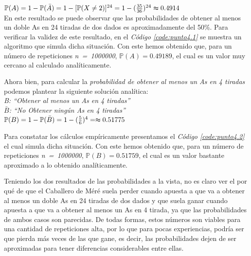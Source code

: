 \documentclass{article}
\newcommand{\refcode}[1]{\textit{Código \ref{#1}}}
\begin{document}
$\mathbb{P}(A) = 1 - \mathbb{P}(\bar{A}) = 1 - [\mathbb{P}(X \neq 2)]^{24} = 1- ({35 \over 36})^{24} \thickapprox 0.4914$ \medskip\\
 
En este resultado se puede observar que las probabilidades de obtener al menos un doble As en 24 tiradas de dos dados es aproximadamente del 50\%. Para verificar la validez de este resultado, en el \refcode{code:punto4.1} se muestra un algoritmo que simula dicha situación.  Con este hemos obtenido que, para un número de repeticiones \mbox{\textit{n = 1000000}}, $\mathbb{P}(A) = 0.49189$, el cual es un valor muy cercano al calculado analíticamente.

 
\bigskip\bigskip

	Ahora bien, para calcular la \textit{probabilidad de obtener al menos un As en 4 tiradas} podemos plantear la siguiente solución analítica:\\

\indent \textit{B: ``Obtener al menos un As en 4 tiradas''}\\
\indent \textit{$\bar{B}$: ``No Obtener ningún As en 4 tiradas''}\\

$\mathbb{P}(B) = 1 - \mathbb{P}(\bar{B}) = 1- ({5 \over 6})^4 = \thickapprox 0.51775$\\\bigskip

	Para constatar los cálculos empíricamente presentamos el \refcode{code:punto4.2} el cual simula dicha situación. Con este hemos obtenido que, para un número de repeticiones \mbox{\textit{n = 1000000}}, $\mathbb{P}(B) = 0.51759$, el cual es un valor bastante aproximado a lo obtenido analíticamente.

\newpage

\bigskip\bigskip

Teniendo los dos resultados de las probabilidades a la vista, no es claro ver el por qué de que el Caballero de Méré suela perder cuando apuesta a que va a obtener al menos un doble As en 24 tiradas de dos dados y que suela ganar cuando apuesta a que va a obtener al menos un As en 4 tirada, ya que las probabilidades de ambos casos  son parecidas. De todas formas, estos números son viables para una cantidad de repeticiones alta, por lo que para pocas experiencias, podría ser que pierda más veces de las que gane, es decir, las probabilidades dejen de ser aproximadas para tener diferencias considerables entre ellas.
\bigskip
\end{document}
